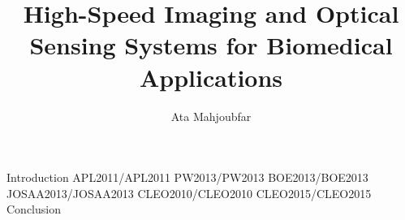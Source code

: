 \documentclass [PhD] {uclathes}
\title          {High-Speed Imaging and Optical Sensing Systems for Biomedical Applications}
\author         {Ata Mahjoubfar}
\begin{document}
\makeintropages

%
%
 {Introduction}                         %
 {APL2011/APL2011}                         %
 {PW2013/PW2013}                         %
 {BOE2013/BOE2013}
 {JOSAA2013/JOSAA2013}
 {CLEO2010/CLEO2010}
 {CLEO2015/CLEO2015}
 {Conclusion}





\end{document}
